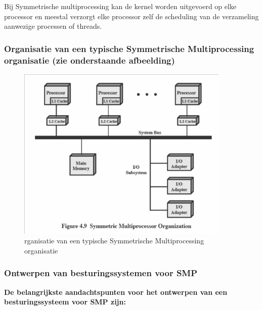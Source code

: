 Bij Symmetrische multiprocessing kan de kernel worden uitgevoerd op elke processor en meestal verzorgt elke processor zelf de scheduling van de verzameling aanwezige processen of threads.


\subsubsection{Organisatie van een typische Symmetrische Multiprocessing organisatie (zie onderstaande afbeelding)}
\begin{figure}[htp]
    \centering
            \includegraphics[width=4in]{img/organisatiesymmulti.png}
        \caption{rganisatie van een typische Symmetrische Multiprocessing organisatie}
    \label{fig:rganisatie van een typische Symmetrische Multiprocessing organisatie}
\end{figure}


\subsubsection{Ontwerpen van besturingssystemen voor SMP}

\textbf{De belangrijkste aandachtspunten voor het ontwerpen van een besturingssysteem voor SMP zijn:}

